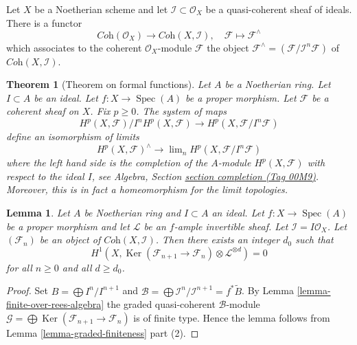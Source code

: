 \documentclass{amsart}
\theoremstyle{plain}
\newtheorem{theorem}[subsection]{Theorem}
\newtheorem{lemma}[subsection]{Lemma}
\theoremstyle{definition}
\theoremstyle{remark}
\numberwithin{equation}{subsection}
\def\lim{\mathop{\mathrm{lim}}\nolimits}
\def\Spec{\mathop{\mathrm{Spec}}}
\def\Ker{\mathop{\mathrm{Ker}}}
\begin{document}
\noindent
Let $X$ be a Noetherian scheme and let $\mathcal{I} \subset \mathcal{O}_X$
be a quasi-coherent sheaf of ideals. There is a functor
\begin{equation}
\label{equation-completion-functor}
\textit{Coh}(\mathcal{O}_X) \longrightarrow \textit{Coh}(X, \mathcal{I}), \quad
\mathcal{F} \longmapsto \mathcal{F}^\wedge
\end{equation}
which associates to the coherent $\mathcal{O}_X$-module $\mathcal{F}$
the object $\mathcal{F}^\wedge = (\mathcal{F}/\mathcal{I}^n\mathcal{F})$
of $\textit{Coh}(X, \mathcal{I})$.

\begin{theorem}[Theorem on formal functions]
\label{theorem-formal-functions}
Let $A$ be a Noetherian ring.
Let $I \subset A$ be an ideal.
Let $f : X \to \Spec(A)$ be a proper morphism.
Let $\mathcal{F}$ be a coherent sheaf on $X$.
Fix $p \geq 0$.
The system of maps
$$
H^p(X, \mathcal{F})/I^nH^p(X, \mathcal{F})
\longrightarrow
H^p(X, \mathcal{F}/I^n\mathcal{F})
$$
define an isomorphism of limits
$$
H^p(X, \mathcal{F})^\wedge
\longrightarrow
\lim_n H^p(X, \mathcal{F}/I^n\mathcal{F})
$$
where the left hand side is the completion of the $A$-module
$H^p(X, \mathcal{F})$ with respect to the ideal $I$, see
Algebra, Section \href{https://stacks.math.columbia.edu/tag/00M9}{section completion (Tag 00M9)}.
Moreover, this is in fact a homeomorphism for the limit topologies.
\end{theorem}

\begin{lemma}
\label{lemma-vanishing-projective}
Let $A$ be Noetherian ring and $I \subset A$ an ideal.
Let $f : X \to \Spec(A)$ be a proper morphism and let
$\mathcal{L}$ be an $f$-ample invertible sheaf. Let
$\mathcal{I} = I\mathcal{O}_X$. Let $(\mathcal{F}_n)$ be an
object of $\textit{Coh}(X, \mathcal{I})$. Then there exists an
integer $d_0$ such that
$$
H^1(X, \Ker(\mathcal{F}_{n + 1} \to \mathcal{F}_n)
\otimes \mathcal{L}^{\otimes d} )
= 0
$$
for all $n \geq 0$ and all $d \geq d_0$.
\end{lemma}

\begin{proof}
Set $B = \bigoplus I^n/I^{n + 1}$ and
$\mathcal{B} = \bigoplus \mathcal{I}^n/\mathcal{I}^{n + 1} = f^*\widetilde{B}$.
By Lemma \ref{lemma-finite-over-rees-algebra} the graded quasi-coherent
$\mathcal{B}$-module
$\mathcal{G} = \bigoplus \Ker(\mathcal{F}_{n + 1} \to \mathcal{F}_n)$
is of finite type. Hence the lemma follows from
Lemma \ref{lemma-graded-finiteness} part (2).
\end{proof}
\end{document}
